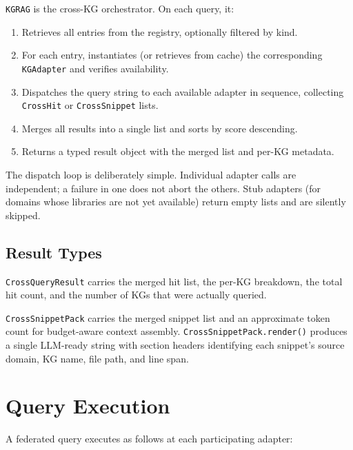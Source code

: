 \documentclass[10pt]{article}
\begin{document}
\texttt{KGRAG} is the cross-KG orchestrator. On each query, it:

\begin{enumerate}
  \item Retrieves all entries from the registry, optionally filtered by kind.
  \item For each entry, instantiates (or retrieves from cache) the corresponding
    \texttt{KGAdapter} and verifies availability.
  \item Dispatches the query string to each available adapter in sequence,
    collecting \texttt{CrossHit} or \texttt{CrossSnippet} lists.
  \item Merges all results into a single list and sorts by score descending.
  \item Returns a typed result object with the merged list and per-KG metadata.
\end{enumerate}

The dispatch loop is deliberately simple. Individual adapter calls are
independent; a failure in one does not abort the others. Stub adapters (for
domains whose libraries are not yet available) return empty lists and are
silently skipped.

\subsection{Result Types}

\texttt{CrossQueryResult} carries the merged hit list, the per-KG breakdown,
the total hit count, and the number of KGs that were actually queried.

\texttt{CrossSnippetPack} carries the merged snippet list and an approximate
token count for budget-aware context assembly. \texttt{CrossSnippetPack.render()}
produces a single LLM-ready string with section headers identifying each
snippet's source domain, KG name, file path, and line span.

\section{Query Execution}

A federated query executes as follows at each participating adapter:
\end{document}
